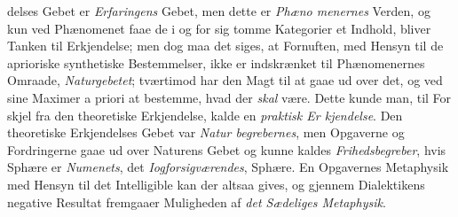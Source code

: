 \documentclass[12pt,a4paper]{book}
\begin{document}
delses Gebet er \emph{Erfaringens} Gebet, men dette er \emph{Phæno\-%
menernes} Verden, og kun ved Phænomenet faae de i og for
sig tomme Kategorier et Indhold, bliver Tanken til Erkjendelse;
men dog maa det siges, at Fornuften, med Hensyn til de
aprioriske synthetiske Bestemmelser, ikke er indskrænket til
Phænomenernes Omraade, \emph{Naturgebetet}; tværtimod har den
Magt til at gaae ud over det, og ved sine Maximer a priori
at bestemme, hvad der \emph{skal} være. Dette kunde man, til For\-%
skjel fra den theoretiske Erkjendelse, kalde en \emph{praktisk Er\-%
kjendelse}. Den theoretiske Erkjendelses Gebet var \emph{Natur\-%
begrebernes}, men Opgaverne og Fordringerne gaae ud over
Naturens Gebet og kunne kaldes \emph{Frihedsbegreber}, hvis
Sphære er \emph{Numenets}, det \emph{Iogforsigværendes}, Sphære.
En Opgavernes Metaphysik med Hensyn til det Intelligible
kan der altsaa gives, og gjennem Dialektikens negative Resultat
fremgaaer Muligheden af \emph{det Sædeliges Metaphysik}.
\end{document}
